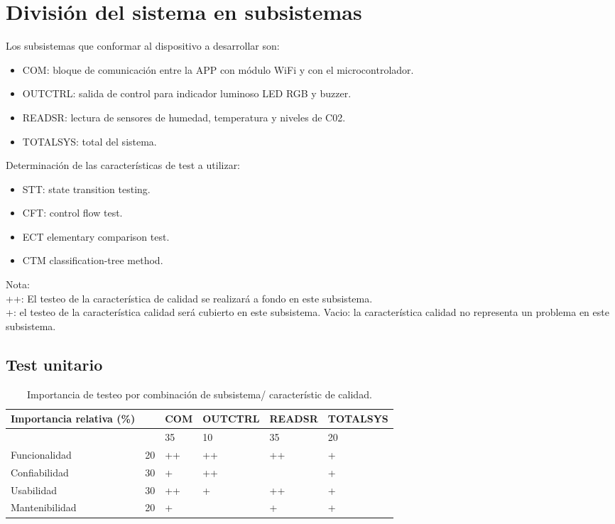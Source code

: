 \documentclass[12pt]{article}
\begin{document}
\section{División del sistema en subsistemas}

Los subsistemas que conformar al dispositivo a desarrollar son:
\begin{itemize}
\item COM: bloque de comunicación entre la APP con módulo WiFi y con el microcontrolador.
\item OUTCTRL: salida de control para indicador luminoso LED RGB y buzzer.
\item READSR: lectura de sensores de humedad, temperatura y niveles de C02.
\item TOTALSYS: total del sistema.
\end{itemize}


Determinación de las características de test a utilizar:
\begin{itemize}
\item STT: state transition testing.
\item CFT: control flow test.
\item ECT elementary comparison test.
\item CTM classification-tree method.
\end{itemize}

Nota:\\
++: El testeo de la característica de calidad se realizará a fondo en este subsistema.\\
+: el testeo de la característica calidad será cubierto en este subsistema.
Vacio: la característica calidad no representa un problema en este subsistema. \\

\subsection{Test unitario}

\begin{table}[ht]
    \centering
    \begin{tabular}{|l|l|l|l|l|l|}\hline \hline
    \rowcolor[HTML]{d6c6c3}
 Importancia relativa (\%)& &  COM & OUTCTRL & READSR & TOTALSYS\\
        \hline
       
           &  &35 & 10 &35 & 20                          \\
        Funcionalidad    & 20 & ++ & ++ & ++ & +		\\
        Confiabilidad    & 30 &+ &++ & &+                        \\
        Usabilidad       & 30 &++ &+ &++ &+                        \\
        Mantenibilidad   & 20 &+ & &+ &+                        \\
        \hline
    \end{tabular}
    \caption{Importancia de testeo por combinación de subsistema/ característic de calidad.}
\end{table}
\end{document}
